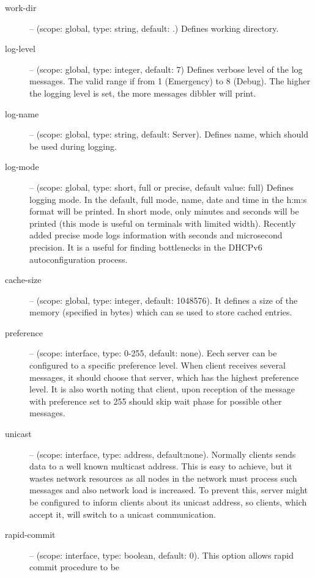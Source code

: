 \begin{description}
 \item[work-dir] -- (scope: global, type: string, default: .) Defines working
	    directory.
 \item[log-level] -- (scope: global, type: integer, default: 7) Defines
	    verbose level of the log messages. The valid range if
	    from 1 (Emergency) to 8 (Debug). The higher the logging
	    level is set, the more messages dibbler will print.
 \item[log-name] -- (scope: global, type: string, default: Server). Defines 
	    name, which should be used during logging.
 \item[log-mode] -- (scope: global, type: short, full or precise,
	    default value: full) Defines logging mode. In the
	    default, full mode, name, date and time in the h:m:s format
	    will be printed. In short mode, only minutes and
	    seconds will be printed (this mode is useful on
	    terminals with limited width). Recently added precise
	    mode logs information with seconds and microsecond
	    precision. It is a useful for finding bottlenecks in
	    the DHCPv6 autoconfiguration process.
 \item[cache-size] -- (scope: global, type: integer, default:
	    1048576). It defines a size of the memory (specified in
            bytes) which can se used to store cached entries.
 \item[preference] -- (scope: interface, type: 0-255, default:
	    none). Eech server can be configured to a specific
	    preference level. When client receives several
	     messages, it should choose that server,
	    which has the highest preference level. It is also worth
	    noting that client, upon reception of the 
	    message with preference set to 255 should skip wait phase
	    for possible other  messages.
 \item[unicast] -- (scope: interface, type: address,
	    default:none). Normally clients sends data to a well known
	    multicast address. This is easy to achieve, but it wastes
	    network resources as all nodes in the network must process
	    such messages and also network load is increased. To prevent
	    this, server might be configured to inform clients about its
	    unicast address, so clients, which accept it, will switch to
	    a unicast communication.
 \item[rapid-commit] -- (scope: interface, type: boolean, default:
            0). This option allows rapid commit procedure to be

\end{description}
